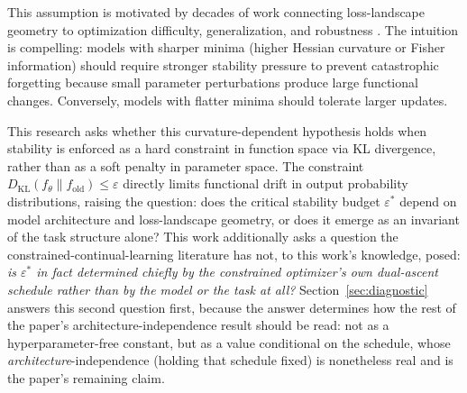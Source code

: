 \documentclass[11pt]{article}
\newcommand{\eps}{\varepsilon}
\newcommand{\epsstar}{\eps^{*}}
\newcommand{\DKL}{D_{\mathrm{KL}}}
\begin{document}
This assumption is motivated by decades of work connecting loss-landscape
geometry to optimization difficulty, generalization, and robustness
\citep{novak2018sensitivity,li2018visualizing,keskar2016large}. The intuition
is compelling: models with sharper minima (higher Hessian curvature or Fisher
information) should require stronger stability pressure to prevent
catastrophic forgetting because small parameter perturbations produce large
functional changes. Conversely, models with flatter minima should tolerate
larger updates.

This research asks whether this curvature-dependent
hypothesis holds when stability is enforced as a hard constraint in function
space via KL divergence, rather than as a soft penalty in parameter space.
The constraint $\DKL(f_\theta \| f_{\mathrm{old}}) \le \eps$ directly limits
functional drift in output probability distributions, raising the question:
does the critical stability budget $\epsstar$ depend on model architecture and
loss-landscape geometry, or does it emerge as an invariant of the task
structure alone? This work additionally asks a question the constrained-continual-learning
literature has not, to this work's knowledge, posed: \emph{is $\epsstar$ in fact
determined chiefly by the constrained optimizer's own dual-ascent schedule
rather than by the model or the task at all?} Section~\ref{sec:diagnostic}
answers this second question first, because the answer determines how the
rest of the paper's architecture-independence result should be read: not as
a hyperparameter-free constant, but as a value conditional on the schedule,
whose \emph{architecture}-independence (holding that schedule fixed) is
nonetheless real and is the paper's remaining claim.
\end{document}
